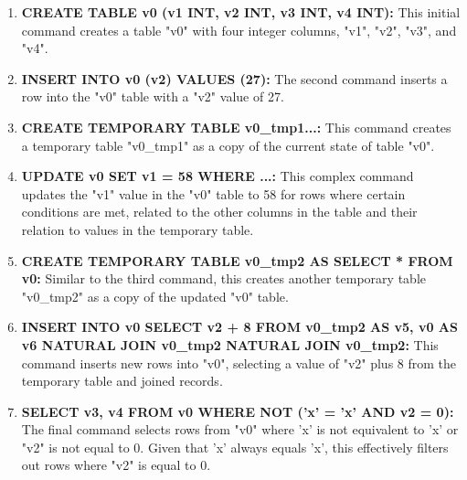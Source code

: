 \documentclass[sigconf]{acmart}
\begin{document}
\begin{enumerate}
\item \textbf{CREATE TABLE v0 (v1 INT, v2 INT, v3 INT, v4 INT):} This initial command creates a table "v0" with four integer columns, "v1", "v2", "v3", and "v4".
\item \textbf{INSERT INTO v0 (v2) VALUES (27):} The second command inserts a row into the "v0" table with a "v2" value of 27.
\item \textbf{CREATE TEMPORARY TABLE v0\_tmp1...:} This command creates a temporary table "v0\_tmp1" as a copy of the current state of table "v0".
\item \textbf{UPDATE v0 SET v1 = 58 WHERE ...:} This complex command updates the "v1" value in the "v0" table to 58 for rows where certain conditions are met, related to the other columns in the table and their relation to values in the temporary table.
\item \textbf{CREATE TEMPORARY TABLE v0\_tmp2 AS SELECT * FROM v0:} Similar to the third command, this creates another temporary table "v0\_tmp2" as a copy of the updated "v0" table.
\item \textbf{INSERT INTO v0 SELECT v2 + 8 FROM v0\_tmp2 AS v5, v0 AS v6 NATURAL JOIN v0\_tmp2 NATURAL JOIN v0\_tmp2:} This command inserts new rows into "v0", selecting a value of "v2" plus 8 from the temporary table and joined records.
\item \textbf{SELECT v3, v4 FROM v0 WHERE NOT ('x' = 'x' AND v2 = 0):} The final command selects rows from "v0" where 'x' is not equivalent to 'x' or "v2" is not equal to 0. Given that 'x' always equals 'x', this effectively filters out rows where "v2" is equal to 0.
\end{enumerate}
\end{document}
